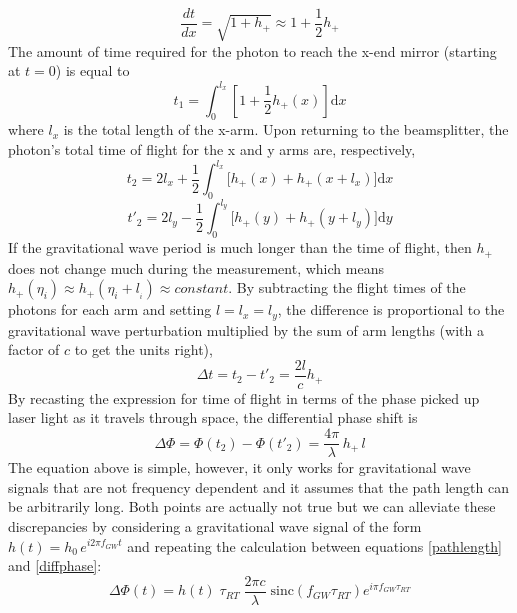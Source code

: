 	\begin{equation}
	\frac{dt}{dx} = \sqrt{ 1+h_{+} } \approx 1+\frac{1}{2} h_{+} 
	\end{equation}
	The amount of time required for the photon to reach the x-end mirror (starting at $t=0$) is equal to
	\begin{equation}\label{pathlength}
	t_1 = \int_{0}^{l_{x}} [1+\frac{1}{2}  h_{+}(x) ] \text{d}x
	\end{equation}
	where $l_x$ is the total length of the x-arm.  Upon returning to the beamsplitter, the photon's total time of flight for the x and y arms are, respectively,
	\begin{equation}
	t_2 = 2 l_x + \frac{1}{2} \int_{0}^{l_x} \bigg[  h_{+}(x) +  h_{+}(x + l_x)  \bigg] \text{d}x
	\end{equation}
	\begin{equation}
	t'_{2}= 2 l_y - \frac{1}{2} \int_{0}^{l_y} \bigg[  h_{+}(y) +  h_{+}(y + l_y)  \bigg] \text{d}y
	\end{equation}
	If the gravitational wave period is much longer than the time of flight, then $h_{+}$ does not change much during the measurement, which means $h_{+}(\eta_i) \approx h_{+}(\eta_i + l_{_i}) \approx constant$.  By subtracting the flight times of the photons for each arm and setting $l = l_x = l_y$, the difference is proportional to the gravitational wave perturbation multiplied by the sum of arm lengths (with a factor of $c$ to get the units right),
	\begin{equation}
	\Delta t = t_2 - t'_{2} = \frac{2l}{c} h_{+}
	\end{equation}
	By recasting the expression for time of flight in terms of the phase picked up laser light as it travels through space, the differential phase shift is
	\begin{equation}\label{diffphase}
	\Delta \Phi = \Phi(t_{2}) - \Phi(t'_{2}) = \frac{4 \pi}{\lambda} \, h_{+} \, l
	\end{equation}
	The equation above is simple, however, it only works for gravitational wave signals that are not frequency dependent and it assumes that the path length can be arbitrarily long. Both points are actually not true \cite{Saulson} but we can alleviate these discrepancies by considering a gravitational wave signal of the form $h(t) = h_0 \, e^{i 2 \pi f_{GW} t}$  and repeating the calculation between equations \ref{pathlength} and \ref{diffphase}:
	\begin{equation}\label{gwsinc}
	\Delta \Phi (t) = h(t) \; \tau_{RT} \; \frac{2 \pi c}{\lambda} \; \text{sinc}(f_{GW} \tau_{RT}) e^{i \pi f_{GW} \tau_{RT}}
	\end{equation}
